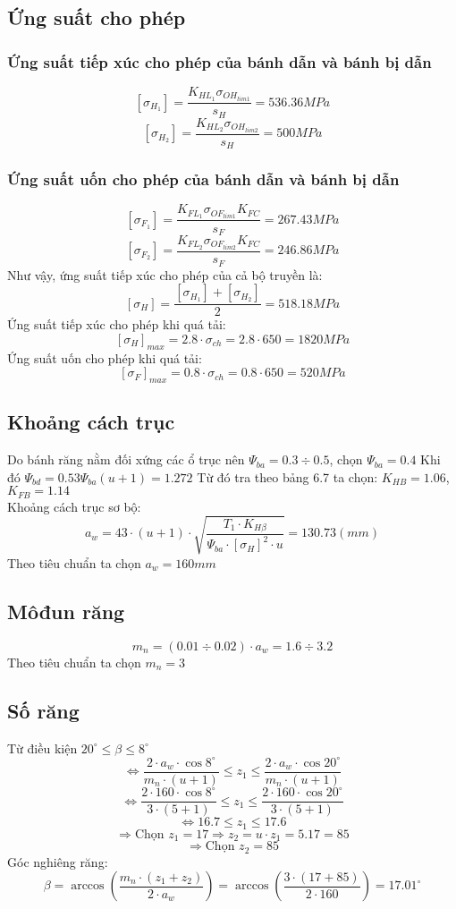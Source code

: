\subsection{Ứng suất cho phép}
\subsubsection{Ứng suất tiếp xúc cho phép của bánh dẫn và bánh bị dẫn}
\[
    [\sigma_{H_1}] = \frac{K_{HL_1}\sigma_{OH_{lim1}}}{s_H} = 536.36MPa
\]
\[
    [\sigma_{H_2}] = \frac{K_{HL_2}\sigma_{OH_{lim2}}}{s_H} = 500MPa
\]
\subsubsection{Ứng suất uốn cho phép của bánh dẫn và bánh bị dẫn}
\[
    [\sigma_{F_1}] = \frac{K_{FL_1}\sigma_{OF_{lim1}}K_{FC}}{s_F} = 267.43MPa
\]
\[
    [\sigma_{F_2}] = \frac{K_{FL_2}\sigma_{OF_{lim2}}K_{FC}}{s_F} = 246.86MPa
\]
Như vậy, ứng suất tiếp xúc cho phép của cả bộ truyền là:
\[
    [\sigma_H] = \frac{[\sigma_{H_1}] + [\sigma_{H_2}]}{2} = 518.18MPa 
\]
Ứng suất tiếp xúc cho phép khi quá tải:
\[
    [\sigma_H]_{max} = 2.8 \cdot \sigma_{ch} = 2.8 \cdot 650 = 1820MPa
\]
Ứng suất uốn cho phép khi quá tải:
\[
    [\sigma_F]_{max} = 0.8 \cdot \sigma_{ch} = 0.8 \cdot 650 = 520MPa
\]

\subsection{Khoảng cách trục}
Do bánh răng nằm đối xứng các ổ trục nên $\Psi_{ba} = 0.3 \div 0.5$, chọn $\Psi_{ba} = 0.4$  
Khi đó $\Psi_{bd} = 0.53\Psi_{ba}(u+1) = 1.272$  
Từ đó tra theo bảng 6.7 \cite{reference} ta chọn: $K_{HB} = 1.06$, $K_{FB} = 1.14$  \\
Khoảng cách trục sơ bộ:
\[
a_w = 43 \cdot (u+1) \cdot \sqrt{\frac{T_1 \cdot K_{H\beta}}{\Psi_{ba} \cdot [\sigma_H]^2 \cdot u}} = 130.73(mm)
\]
Theo tiêu chuẩn ta chọn $a_w = 160mm$

\subsection{Môđun răng}

\[
m_n = (0.01 \div 0.02) \cdot a_w = 1.6 \div 3.2
\]
Theo tiêu chuẩn ta chọn $m_n = 3$
\subsection{Số răng}
Từ điều kiện $20^\circ \leq \beta \leq 8^\circ$
\[
\Leftrightarrow \frac{2 \cdot a_w \cdot \cos 8^\circ}{m_n \cdot (u+1)} \leq z_1 \leq \frac{2 \cdot a_w \cdot \cos 20^\circ}{m_n \cdot (u+1)}
\]
\[
\Leftrightarrow \frac{2 \cdot 160 \cdot \cos 8^\circ}{3 \cdot (5+1)} \leq z_1 \leq \frac{2 \cdot 160 \cdot \cos 20^\circ}{3 \cdot (5+1)}
\]
\[
\Leftrightarrow 16.7 \leq z_1 \leq 17.6
\]
\[
\Rightarrow \text{Chọn } z_1 = 17 \Rightarrow z_2 = u \cdot z_1 = 5.17 = 85
\]
\[
\Rightarrow \text{Chọn } z_2 = 85
\]
Góc nghiêng răng:
\[
\beta = \arccos \left( \frac{m_n \cdot (z_1 + z_2)}{2 \cdot a_w} \right) = \arccos \left( \frac{3 \cdot (17+85)}{2 \cdot 160} \right) = 17.01^\circ
\]

